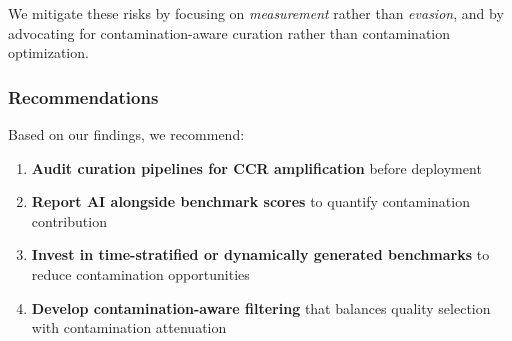 We mitigate these risks by focusing on \textit{measurement} rather than \textit{evasion}, and by advocating for contamination-aware curation rather than contamination optimization.

\subsubsection{Recommendations}

Based on our findings, we recommend:

\begin{enumerate}
    \item \textbf{Audit curation pipelines for CCR amplification} before deployment
    \item \textbf{Report AI alongside benchmark scores} to quantify contamination contribution
    \item \textbf{Invest in time-stratified or dynamically generated benchmarks} to reduce contamination opportunities
    \item \textbf{Develop contamination-aware filtering} that balances quality selection with contamination attenuation
\end{enumerate}
